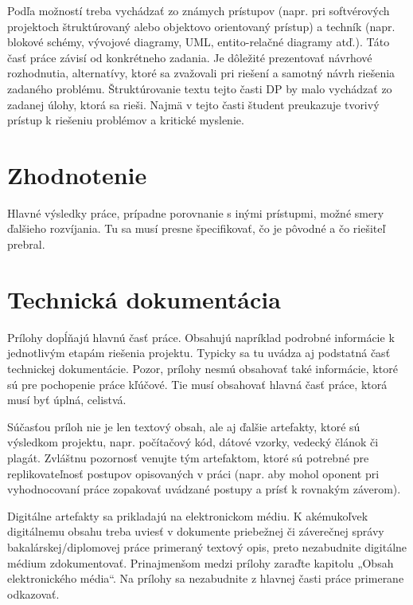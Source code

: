 \documentclass[12pt, a4paper, twoside, openright, slovak]{book}
\newcommand{\emptypage}{\newpage\thispagestyle{empty}\mbox{}\newpage}
\begin{document}
Podľa možností treba vychádzať zo známych prístupov (napr. pri softvérových projektoch štruktúrovaný alebo objektovo orientovaný prístup) a techník (napr. blokové schémy, vývojové diagramy, UML, entito-relačné diagramy atď.). Táto časť práce závisí od konkrétneho zadania.
Je dôležité prezentovať návrhové rozhodnutia, alternatívy, ktoré sa zvažovali pri riešení a samotný návrh riešenia zadaného problému. Štruktúrovanie textu tejto časti DP by malo vychádzať zo zadanej úlohy, ktorá sa rieši. Najmä v tejto časti študent preukazuje tvorivý prístup k riešeniu problémov a kritické myslenie.
\emptypage


\chapter{Zhodnotenie}
Hlavné výsledky práce, prípadne porovnanie s inými prístupmi, možné smery ďalšieho rozvíjania.
Tu sa musí presne špecifikovať, čo je pôvodné a čo riešiteľ prebral.
\emptypage


\nocite{*}
\printbibliography[title={Literatúra}]

\appendix

\setcounter{figure}{0}
\chapter{Technická dokumentácia}
\renewcommand*{\thepage}{A-\arabic{page}}

Prílohy dopĺňajú hlavnú časť práce. Obsahujú napríklad podrobné informácie k jednotlivým
etapám riešenia projektu. Typicky sa tu uvádza aj podstatná časť technickej dokumentácie.
Pozor, prílohy nesmú obsahovať také informácie, ktoré sú pre pochopenie práce kľúčové. Tie
musí obsahovať hlavná časť práce, ktorá musí byť úplná, celistvá.

Súčasťou príloh nie je len textový obsah, ale aj ďalšie artefakty, ktoré sú výsledkom projektu,
napr. počítačový kód, dátové vzorky, vedecký článok či plagát. Zvláštnu pozornosť venujte tým
artefaktom, ktoré sú potrebné pre replikovateľnosť postupov opisovaných v práci (napr. aby
mohol oponent pri vyhodnocovaní práce zopakovať uvádzané postupy a prísť k rovnakým
záverom). 

Digitálne artefakty sa prikladajú na elektronickom médiu. K akémukoľvek
digitálnemu obsahu treba uviesť v dokumente priebežnej či záverečnej správy
bakalárskej/diplomovej práce primeraný textový opis, preto nezabudnite digitálne médium
zdokumentovať. Prinajmenšom medzi prílohy zaraďte kapitolu „Obsah elektronického média“.
Na prílohy sa nezabudnite z hlavnej časti práce primerane odkazovať.
\end{document}
